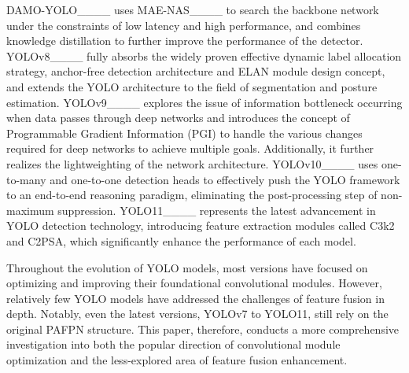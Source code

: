 DAMO-YOLO____ uses MAE-NAS____ to search the backbone network under the constraints of low latency and high performance, and combines knowledge distillation to further improve the performance of the detector. 
YOLOv8____ fully absorbs the widely proven effective dynamic label allocation strategy, anchor-free detection architecture and ELAN module design concept, and extends the YOLO architecture to the field of segmentation and posture estimation. YOLOv9____ explores the issue of information bottleneck occurring when data passes through deep networks and introduces the concept of Programmable Gradient Information (PGI) to handle the various changes required for deep networks to achieve multiple goals. Additionally, it further realizes the lightweighting of the network architecture. YOLOv10____ uses one-to-many and one-to-one detection heads to effectively push the YOLO framework to an end-to-end reasoning paradigm, eliminating the post-processing step of non-maximum suppression. YOLO11____ represents the latest advancement in YOLO detection technology, introducing feature extraction modules called C3k2 and C2PSA, which significantly enhance the performance of each model. 

Throughout the evolution of YOLO models, most versions have focused on optimizing and improving their foundational convolutional modules. However, relatively few YOLO models have addressed the challenges of feature fusion in depth. Notably, even the latest versions, YOLOv7 to YOLO11, still rely on the original PAFPN structure. This paper, therefore, conducts a more comprehensive investigation into both the popular direction of convolutional module optimization and the less-explored area of feature fusion enhancement.

